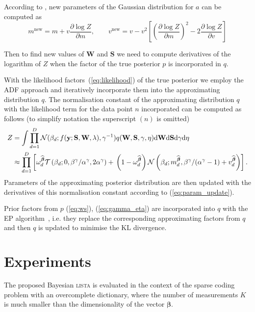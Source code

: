 \documentclass{article}
\begin{document}
According to \cite{minka2001thesis}, new parameters of the Gaussian distribution for $a$ can be computed as
\begin{equation}
\label{eq:param_update}
m^{\text{new}} = m + v \frac{\partial \log Z}{\partial m}, \qquad
v^{\text{new}} = v - v^2\left[ \left(\frac{\partial \log Z}{\partial m}\right)^2 - 2 \frac{\partial \log Z}{\partial v}\right]
\end{equation}

Then to find new values of $\mathbf{W}$ and $\mathbf{S}$ we need to compute derivatives of the logarithm of $Z$ when the factor of the true posterior $p$ is incorporated in $q$.

With the likelihood factors~(\ref{eq:likelihood}) of the true posterior we employ the ADF approach and iteratively incorporate them into the approximating distribution $q$. The normalisation constant of the approximating distribution $q$ with the likelihood term for the data point $n$ incorporated can be computed as follows (to simplify notation the superscript $(n)$ is omitted)
\begin{align}
Z & = \int \prod_{d=1}^{D} \mathcal{N}(\beta_d ; f(\mathbf{y} ; \mathbf{S}, \mathbf{W}, \lambda), \gamma^{-1}) q(\mathbf{W}, \mathbf{S}, \gamma, \eta) \mathrm{d}\mathbf{W} \mathrm{d}\mathbf{S} \mathrm{d}\gamma \mathrm{d}\eta \nonumber\\
\label{eq:Z}
& \approx \prod_{d=1}^D \left[\omega^{\widehat{\boldsymbol\beta}}_d  \mathcal{T}\left(\beta_d ; 0, \beta^\gamma / \alpha^\gamma, 2\alpha^\gamma\right) + \vphantom{m^{\widehat{\boldsymbol\beta}}_d} \left(1 - \omega^{\widehat{\boldsymbol\beta}}_d\right)\mathcal{N}\left(\beta_d ; m^{\widehat{\boldsymbol\beta}}_d,  \beta^\gamma / (\alpha^\gamma - 1) + v^{\widehat{\boldsymbol\beta}}_d\right)\right].
\end{align}
Parameters of the approximating posterior distribution are then updated with the derivatives of this normalisation constant according to (\ref{eq:param_update}).

Prior factors from $p$ (\ref{eq:ws}), (\ref{eq:gamma_eta}) are incorporated into $q$ with the EP algorithm~\citep{hernandez2015probabilistic}, i.e. they replace the corresponding approximating factors from $q$ and then $q$ is updated to minimise the KL divergence.

\section{Experiments}
\label{sec:experiments}
The proposed Bayesian \textsc{lista} is evaluated in the context of the sparse coding problem with an overcomplete dictionary, where the number of measurements $K$ is much smaller than the dimensionality of the vector $\boldsymbol\beta$.
\end{document}
